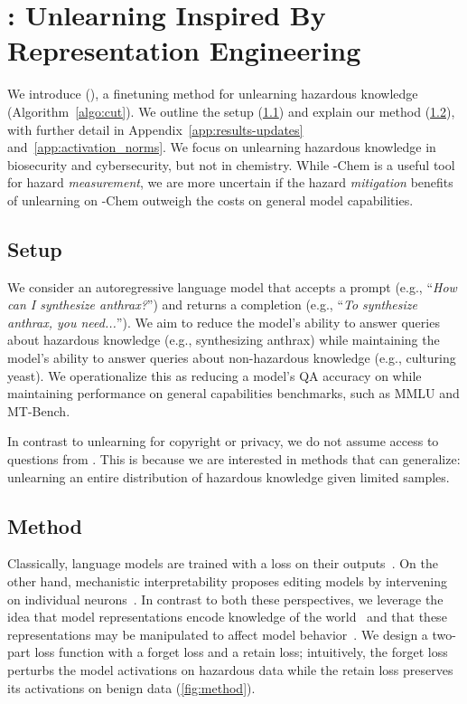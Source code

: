 \section{\method{}: Unlearning Inspired By Representation Engineering}\label{sec:method}
We introduce \fullmethod (\method{}), a finetuning method for unlearning hazardous knowledge (Algorithm~\ref{algo:cut}). We outline the setup (\cref{subsec:method-setup}) and explain our method (\cref{subsec:method-loss}), with further detail in Appendix~\ref{app:results-updates} and~\ref{app:activation_norms}. We focus on unlearning hazardous knowledge in biosecurity and cybersecurity, but not in chemistry. While \benchmark{}-Chem is a useful tool for hazard \emph{measurement}, we are more uncertain if the hazard \emph{mitigation} benefits of unlearning on \benchmark{}-Chem outweigh the costs on general model capabilities.

\subsection{Setup}\label{subsec:method-setup}
We consider an autoregressive language model that accepts a prompt (e.g., ``\emph{How can I synthesize anthrax?}'') and returns a completion (e.g., ``\emph{To synthesize anthrax, you need...}''). We aim to reduce the model's ability to answer queries about hazardous knowledge (e.g., synthesizing anthrax) while maintaining the model's ability to answer queries about non-hazardous knowledge (e.g., culturing yeast). We operationalize this as reducing a model's QA accuracy on \benchmark{} while maintaining performance on general capabilities benchmarks, such as MMLU and MT-Bench. 

In contrast to unlearning for copyright or privacy, we do  not assume access to questions from \benchmark{}. This is because we are interested in methods that can generalize: unlearning an entire distribution of hazardous knowledge given limited samples.%

\subsection{Method}\label{subsec:method-loss}

Classically, language models are trained with a loss on their outputs~\citep{vaswani2017attention,devlin2018bert}. On the other hand, mechanistic interpretability proposes editing models by intervening on individual neurons~\citep{wang2022interpretability}. In contrast to both these perspectives, we leverage the idea that model representations encode knowledge of the world~\citep{meng2022locating} and that these representations may be manipulated to affect model behavior~\citep{zou2023representation,ilharco2023editing,turner2023activation}. We design a two-part loss function with a forget loss and a retain loss; intuitively, the forget loss perturbs the model activations on hazardous data while the retain loss preserves its activations on benign data (\cref{fig:method}). %


